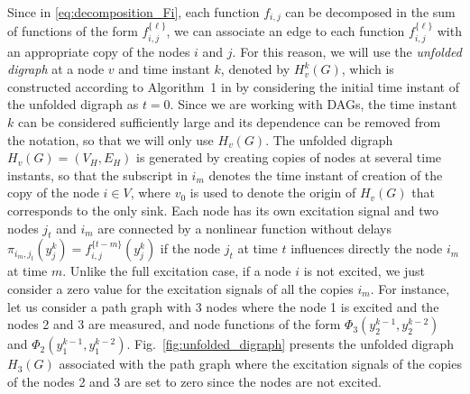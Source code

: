 \documentclass[letterpaper,10pt,journal]{IEEEtran}
\begin{document}
Since in \eqref{eq:decomposition_Fi}, each function $f_{i,j}$ can be decomposed in the sum of functions of the form $f_{i,j}^{\{\ell\}}$, we can associate an edge to each function $f_{i,j}^{\{\ell\}}$ with an appropriate copy of the nodes $i$ and $j$. For this reason, we will use the \emph{unfolded digraph} at a node $v$ and time instant $k$, denoted by $H_v^k(G)$, which is constructed according to Algorithm~1 in \cite{vizuete2026nonlinear} by considering the initial time instant of the unfolded digraph as $t=0$. Since we are working with DAGs, the time instant $k$ can be considered sufficiently large and its dependence can be removed from the notation, so that we will only use $H_v(G)$. The unfolded digraph $H_v(G)=(V_H,E_H)$ is generated by creating copies of nodes at several time instants, so that the subscript in $i_m$ denotes the time instant of creation of the copy of the node $i\in V$, where $v_0$ is used to denote the origin of $H_v(G)$ that corresponds to the only sink. Each node has its own excitation signal and two nodes $j_t$ and $i_m$ are connected by a nonlinear function without delays $\pi_{i_m,j_t}(y_j^k)=f_{i,j}^{\{t-m\}}(y_j^k)$ if the node $j_t$ at time $t$ influences directly the node $i_m$ at time $m$. Unlike the full excitation case, if a node $i$ is not excited, we just consider a zero value for the excitation signals of all the copies $i_m$. For instance, let us consider a path graph with 3 nodes where the node 1 is excited and the nodes 2 and 3 are measured, and node functions of the form $\Phi_3(y_2^{k-1},y_2^{k-2})$ and $\Phi_2(y_1^{k-1},y_1^{k-2})$. Fig.~\ref{fig:unfolded_digraph} presents the unfolded digraph $H_3(G)$ associated with the path graph where the excitation signals of the copies of the nodes 2 and 3 are set to zero since the nodes are not excited.  
\end{document}
